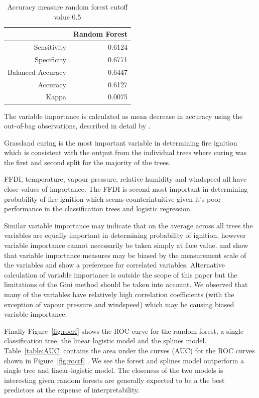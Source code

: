 \documentclass[11pt,a4paper]{article}
\begin{document}
\begin{table}
  \centering
  \begin{tabular}{rr}
    \toprule
                      & Random Forest \\
    \midrule
    Sensitivity       & 0.6124 \\
    Specificity       & 0.6771 \\
    Balanced Accuracy & 0.6447 \\
    Accuracy          & 0.6127 \\
    Kappa             & 0.0075 \\
    \bottomrule
  \end{tabular}
  \caption{Accuracy measure random forest cutoff value 0.5}
  \label{table:accrf}
\end{table}

The variable importance is calculated as mean decrease in accuracy using the out-of-bag observations, described in detail by \citet{archer08}. 

Grassland curing is the most important variable in determining fire ignition which is consistent with the output from the individual trees where curing was the first and second split for the majority of the trees.

FFDI, temperature, vapour pressure, relative humidity and windspeed all have close values of importance. The FFDI is second most important in determining probability of fire ignition which seems counterintuitive given it's poor performance in the classification trees and logistic regression.

Similar variable importance may indicate that on the average across all trees the variables are equally important in determining probability of ignition, however variable importance cannot necessarily be taken simply at face value. \citet{strob07}  and \citet{strob08} show that variable importance measures may be biased by the measurement scale of the variables and show a preference for correlated variables. Alternative calculation of variable importance is outside the scope of this paper but the limitations of the Gini method should be taken into account.
We observed that many of the variables have relatively high correlation coefficients (with the exception of vapour pressure and windspeed) which may be causing biased variable importance.

Finally Figure~\ref{fig:rocrf} shows the ROC curve for the random forest, a single classification tree, the linear logistic model and the splines model. Table~\ref{table:AUC} contains the area under the curves (AUC) for the ROC curves shown in Figure~\ref{fig:rocrf} . We see the forest and splines model outperform a single tree and linear-logistic model. The closeness of the two models is interesting given random forests are generally expected to be a the best predictors at the expense of interpretability.
\end{document}
